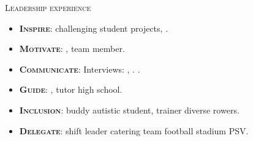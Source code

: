 \documentclass[11pt, a4paper]{article}
\newcommand{\dates}[1]{\hfill\mbox{\textbf{#1}}} %
\newcommand{\headright}[1]{
    \vspace*{1.5ex}\textsc{\Large\color{cvblue}#1}\par%
    \vspace*{-2ex}{\color{cvblue}\hrulefill}\par
}
\begin{document}
\begin{minipage}[t]{0.56\textwidth}
    \headright{Leadership experience}

    \begin{itemize}
        \item \textbf{\textsc{Inspire}}: challenging student projects, .
        \item \textbf{\textsc{Motivate}}: , team member.
        \item \textbf{\textsc{Communicate}}: Interviews: , . .
        \item \textbf{\textsc{Guide}}: , tutor high school.
        \item \textbf{\textsc{Inclusion}}: buddy autistic student, trainer diverse rowers.
        \item \textbf{\textsc{Delegate}}: shift leader catering team football stadium PSV.
    \end{itemize}











\end{minipage}
\end{document}
